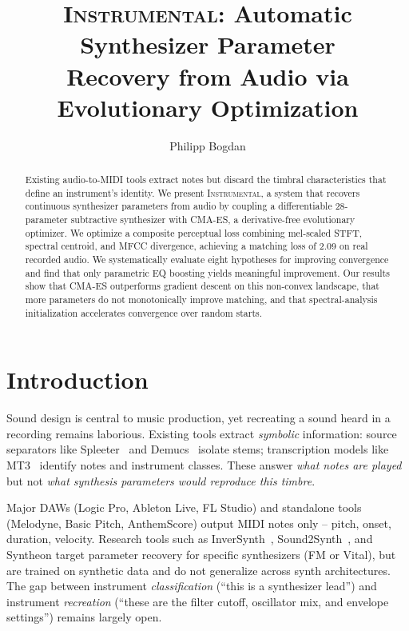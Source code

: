 \documentclass[10pt,twocolumn]{article}
\title{\textsc{Instrumental}: Automatic Synthesizer Parameter\\Recovery from Audio via Evolutionary Optimization}
\author{Philipp Bogdan\;\orcidlink{0009-0009-7405-3555}}
\date{}
\begin{document}
\maketitle

\begin{abstract}
\noindent Existing audio-to-MIDI tools extract notes but discard the timbral characteristics that define an instrument's identity. We present \textsc{Instrumental}, a system that recovers continuous synthesizer parameters from audio by coupling a differentiable 28-parameter subtractive synthesizer with CMA-ES, a derivative-free evolutionary optimizer. We optimize a composite perceptual loss combining mel-scaled STFT, spectral centroid, and MFCC divergence, achieving a matching loss of 2.09 on real recorded audio. We systematically evaluate eight hypotheses for improving convergence and find that only parametric EQ boosting yields meaningful improvement. Our results show that CMA-ES outperforms gradient descent on this non-convex landscape, that more parameters do not monotonically improve matching, and that spectral-analysis initialization accelerates convergence over random starts.
\end{abstract}

\section{Introduction}

Sound design is central to music production, yet recreating a sound heard in a recording remains laborious. Existing tools extract \emph{symbolic} information: source separators like Spleeter~\cite{hennequin2020spleeter} and Demucs~\cite{defossez2021hybrid} isolate stems; transcription models like MT3~\cite{gardner2022mt3} identify notes and instrument classes. These answer \emph{what notes are played} but not \emph{what synthesis parameters would reproduce this timbre}.

Major DAWs (Logic Pro, Ableton Live, FL Studio) and standalone tools (Melodyne, Basic Pitch, AnthemScore) output MIDI notes only -- pitch, onset, duration, velocity. Research tools such as InverSynth~\cite{barkan2019inversynth}, Sound2Synth~\cite{chen2022sound2synth}, and Syntheon target parameter recovery for specific synthesizers (FM or Vital), but are trained on synthetic data and do not generalize across synth architectures. The gap between instrument \emph{classification} (``this is a synthesizer lead'') and instrument \emph{recreation} (``these are the filter cutoff, oscillator mix, and envelope settings'') remains largely open.
\end{document}
